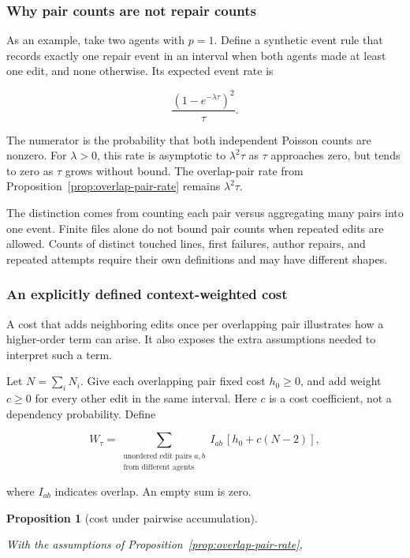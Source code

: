 \documentclass[pdflatex,sn-mathphys-ay]{sn-jnl}
\theoremstyle{thmstyleone}
\newtheorem{proposition}[theorem]{Proposition}
\theoremstyle{thmstylethree}
\begin{document}
\begin{appendices}
\subsubsection{Why pair counts are not repair counts}\label{app:pairs-not-repairs}

As an example, take two agents with \(p=1\). Define a synthetic event rule that records exactly one repair event in an interval when both agents made at least one edit, and none otherwise. Its expected event rate is

\[
\frac{(1-e^{-\lambda\tau})^2}{\tau}.
\]

The numerator is the probability that both independent Poisson counts are nonzero. For \(\lambda>0\), this rate is asymptotic to \(\lambda^2\tau\) as \(\tau\) approaches zero, but tends to zero as \(\tau\) grows without bound. The overlap-pair rate from Proposition~\ref{prop:overlap-pair-rate} remains \(\lambda^2\tau\).

The distinction comes from counting each pair versus aggregating many pairs into one event. Finite files alone do not bound pair counts when repeated edits are allowed. Counts of distinct touched lines, first failures, author repairs, and repeated attempts require their own definitions and may have different shapes.

\subsubsection{An explicitly defined context-weighted cost}\label{app:context-cost}

A cost that adds neighboring edits once per overlapping pair illustrates how a higher-order term can arise. It also exposes the extra assumptions needed to interpret such a term.

Let \(N=\sum_iN_i\). Give each overlapping pair fixed cost \(h_0\ge0\), and add weight \(c\ge0\) for every other edit in the same interval. Here \(c\) is a cost coefficient, not a dependency probability. Define

\[
W_\tau
=\sum_{\substack{\text{unordered edit pairs }a,b\\
                  \text{from different agents}}}
I_{ab}\,[h_0+c(N-2)],
\]

where \(I_{ab}\) indicates overlap. An empty sum is zero.

\begin{proposition}[cost under pairwise accumulation]\label{prop:context-cost}

With the assumptions of Proposition~\ref{prop:overlap-pair-rate},


\end{proposition}
\end{appendices}
\end{document}
